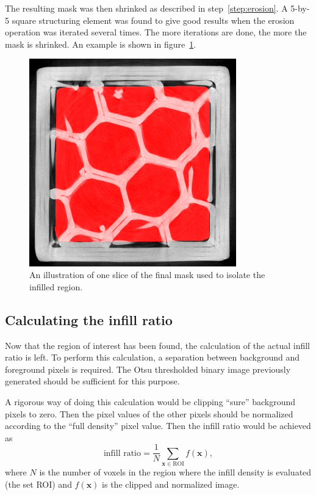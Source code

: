 \documentclass[a4paper,twoside,12pt]{article}
\begin{document}
The resulting mask was then shrinked as described in step~\ref{step:erosion}. A 5-by-5 square structuring element was found to give good results when the erosion operation was iterated several times. The more iterations are done, the more the mask is shrinked. An example is shown in figure~\ref{fig:eroded}.
\begin{figure}
    \centering
    \includegraphics[width=0.8\textwidth]{images/eroded_24.png}
    \caption{An illustration of one slice of the final mask used to isolate the infilled region.}
    \label{fig:eroded}
\end{figure}

\subsection{Calculating the infill ratio}
Now that the region of interest has been found, the calculation of the actual infill ratio is left. To perform this calculation, a separation between background and foreground pixels is required. The Otsu thresholded binary image previously generated should be sufficient for this purpose.

A rigorous way of doing this calculation would be clipping ``sure'' background pixels to zero. Then the pixel values of the other pixels should be normalized according to the ``full density'' pixel value. Then the infill ratio would be achieved as
\[
    \text{infill ratio} = \frac{1}{N} \sum\limits_{\mathbf{x} \in \text{ROI}} f(\mathbf{x}),
\]
where $N$ is the number of voxels in the region where the infill density is evaluated (the set ROI) and $f(\mathbf{x})$ is the clipped and normalized image.
\end{document}
